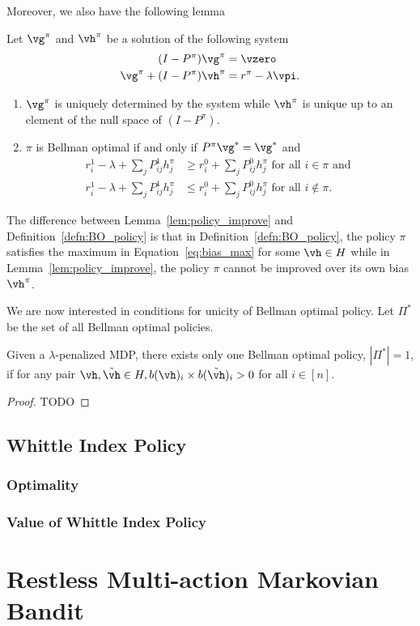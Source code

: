 Moreover, we also have the following lemma
\begin{lem}
    \label{lem:policy_improve}
    Let $\vg^\pi$ and $\vh^\pi$ be a solution of the following system
    \begin{align}
        (I-P^\pi)\vg^\pi &=\vzero \label{eq:gain_eval}\\
        \vg^\pi +(I-P^\pi)\vh^\pi &= r^\pi -\lambda\vpi \label{eq:bias_eval}.
    \end{align}
    \begin{enumerate}
        \item $\vg^\pi$ is uniquely determined by the system while $\vh^\pi$ is unique up to an element of the null space of $(I-P^\pi)$.
        \item $\pi$ is Bellman optimal if and only if $P^\pi\vg^*=\vg^*$ and
            \begin{align*}
                r^1_i-\lambda +\sum_{j}P^1_{ij}h^\pi_j &\ge r^0_i +\sum_{j}P^0_{ij}h^\pi_j \text{ for all } i\in\pi \text{ and } \\
                r^1_i-\lambda +\sum_{j}P^1_{ij}h^\pi_j &\le r^0_i +\sum_{j}P^0_{ij}h^\pi_j \text{ for all } i\notin\pi.
        \end{align*}
    \end{enumerate}
\end{lem}
The difference between Lemma~\ref{lem:policy_improve} and Definition~\ref{defn:BO_policy} is that in Definition~\ref{defn:BO_policy}, the policy $\pi$ satisfies the maximum in Equation~\eqref{eq:bias_max} for some $\vh\in H$ while in Lemma~\ref{lem:policy_improve}, the policy $\pi$ cannot be improved over its own bias $\vh^\pi$.

We are now interested in conditions for unicity of Bellman optimal policy.
Let $\Pi^*$ be the set of all Bellman optimal policies. 

\begin{lem}
\label{lem:unicity_BO}
Given a $\lambda$-penalized MDP, there exists only one Bellman optimal policy, $|\Pi^*|=1$, if for any pair $\vh, \tilde{\vh}\in H, b(\vh)_i\times b(\tilde{\vh})_i>0$ for all $i\in[n]$.
\end{lem}
\begin{proof}
    TODO
\end{proof}


\subsection{Whittle Index Policy}
\label{subsec:whittle_idx}

\subsubsection{Optimality}

\subsubsection{Value of Whittle Index Policy}

\section{Restless Multi-action Markovian Bandit}
